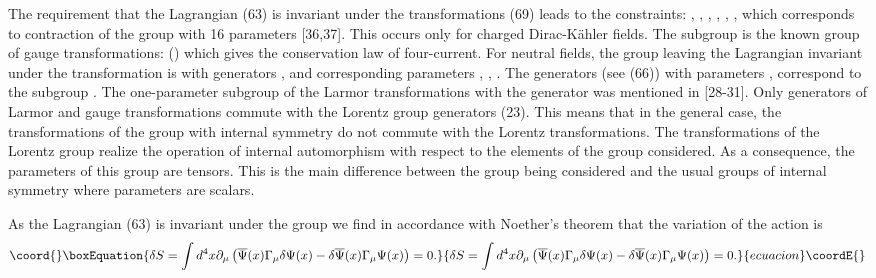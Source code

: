 \documentclass[a4paper,12pt]{article}
\begin{document}
The requirement that the Lagrangian (63) is invariant under the
transformations (69) leads to the constraints: \myHighlight{$\alpha
^{*}=-\alpha $}\coordHE{}, \coordHE{}, \coordHE{}, \coordHE{}, \coordHE{}, \coordHE{}  \coordHE{},
\myHighlight{$\xi ^{*}=\xi $}\coordHE{} which corresponds to contraction of the \coordHE{} group with 16 parameters [36,37]. This occurs
only for charged Dirac-K\"ahler fields. The subgroup \coordHE{} is the
known group of gauge transformations: \coordHE{} (\myHighlight{$\alpha ^{*}=-\alpha $}\coordHE{}) which
gives the conservation law of four-current. For neutral fields,
the group leaving the Lagrangian invariant under the
transformation is \coordHE{} with generators \coordHE{},
\coordHE{} and corresponding parameters \coordHE{}, \coordHE{},
\coordHE{}  \coordHE{}. The
generators \coordHE{} (see (66)) with parameters \coordHE{}, \coordHE{}
correspond to the subgroup \coordHE{}. The one-parameter subgroup
of the Larmor transformations with the generator \coordHE{}
was mentioned in [28-31]. Only generators of Larmor and gauge
transformations commute with the Lorentz group generators (23).
This means that in the general case, the transformations of the
group with internal symmetry \coordHE{} do not commute with the
Lorentz transformations. The transformations of the Lorentz group
realize the operation of internal automorphism with respect to the
elements of the group considered. As a consequence, the parameters
of this group are tensors. This is the main difference between the
group being considered and the usual groups of internal symmetry
where parameters are scalars.

As the Lagrangian (63) is invariant under the \coordHE{} group we
find in accordance with Noether's theorem that the variation of the action
is
\begin{equation}\coord{}\boxEquation{
\delta S=\int d^4x\partial _\mu \left( \overline{\Psi }(x)\Gamma
_\mu \delta \Psi (x)-\delta \overline{\Psi }(x)\Gamma _\mu \Psi
(x)\right) =0 . \label{70}
}{
\delta S=\int d^4x\partial _\mu \left( \overline{\Psi }(x)\Gamma
_\mu \delta \Psi (x)-\delta \overline{\Psi }(x)\Gamma _\mu \Psi
(x)\right) =0 . }{ecuacion}\coordE{}\end{equation}
\end{document}
